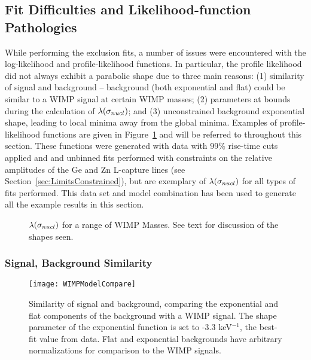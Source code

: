 	\subsection{Fit Difficulties and Likelihood-function Pathologies}
	\label{sec:LLPathologies}
			
While performing the exclusion fits, a number of issues were encountered with the log-likelihood and profile-likelihood functions.  In particular, the profile likelihood did not always exhibit a parabolic shape due to three main reasons: (1) similarity of signal and background -- background (both exponential and flat) could be similar to a WIMP signal at certain WIMP masses; (2) parameters at bounds during the calculation of $\pll$; and (3) unconstrained background exponential shape, leading to local minima away from the global minima.  Examples of profile-likelihood functions are given in Figure~\ref{fig:FitPathologies} and will be referred to throughout this section.  These functions were generated with data with 99\% rise-time cuts applied and and unbinned fits performed with constraints on the relative amplitudes of the Ge and Zn L-capture lines (see Section~\ref{sec:LimitsConstrained}), but are exemplary of $\pll$ for all types of fits performed.  This data set and model combination has been used to generate all the example results in this section.
		
		\begin{figure}
			\centering
			\caption[$\pll$ for a range of WIMP Masses]
			{$\pll$ for a range of WIMP Masses.  See text for discussion of the shapes
			seen.}
			\label{fig:FitPathologies}
		\end{figure}
		
		\subsubsection{Signal, Background Similarity}
		\label{sec:LLPathoSBSimilarity}
			
			\begin{figure}
				\centering
				\texttt{[image: WIMPModelCompare]}
				\caption[Similarity of WIMP signal and background]
				{Similarity of signal and background, comparing the exponential and flat components of the background with a WIMP signal.  
				The shape parameter of the exponential function is set to -3.3 keV$^{-1}$, the best-fit value from data.  Flat and exponential backgrounds have 
				arbitrary normalizations for comparison to the WIMP signals.}
				\label{fig:SBSimilarity}
			\end{figure}			
			
